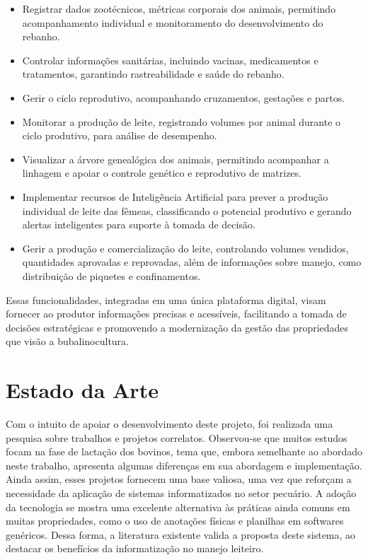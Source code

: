 \documentclass[11pt,a4paper]{article}
\begin{document}
\begin{itemize}
    \item Registrar dados zootécnicos, métricas corporais dos animais, permitindo acompanhamento individual e monitoramento do desenvolvimento do rebanho.
    \item Controlar informações sanitárias, incluindo vacinas, medicamentos e tratamentos, garantindo rastreabilidade e saúde do rebanho.
    \item Gerir o ciclo reprodutivo, acompanhando cruzamentos, gestações e partos.
    \item Monitorar a produção de leite, registrando volumes por animal durante o ciclo produtivo, para análise de desempenho.
    \item Visualizar a árvore genealógica dos animais, permitindo acompanhar a linhagem e apoiar o controle genético e reprodutivo de matrizes.
    \item Implementar recursos de Inteligência Artificial para prever a produção individual de leite das fêmeas, classificando o potencial produtivo e gerando alertas inteligentes para suporte à tomada de decisão.
    \item Gerir a produção e comercialização do leite, controlando volumes vendidos, quantidades aprovadas e reprovadas, além de informações sobre manejo, como distribuição de piquetes e confinamentos.
\end{itemize}

Essas funcionalidades, integradas em uma única plataforma digital, visam fornecer ao produtor informações precisas e acessíveis, facilitando a tomada de decisões estratégicas e promovendo a modernização da gestão das propriedades que visão a bubalinocultura.


\section{Estado da Arte}

Com o intuito de apoiar o desenvolvimento deste projeto, foi realizada uma pesquisa sobre trabalhos e projetos correlatos. Observou-se que muitos estudos focam na fase de lactação dos bovinos, tema que, embora semelhante ao abordado neste trabalho, apresenta algumas diferenças em sua abordagem e implementação. Ainda assim, esses projetos fornecem uma base valiosa, uma vez que reforçam a necessidade da aplicação de sistemas informatizados no setor pecuário. A adoção da tecnologia se mostra uma excelente alternativa às práticas ainda comuns em muitas propriedades, como o uso de anotações físicas e planilhas em softwares genéricos. Dessa forma, a literatura existente valida a proposta deste sistema, ao destacar os benefícios da informatização no manejo leiteiro.
\end{document}
